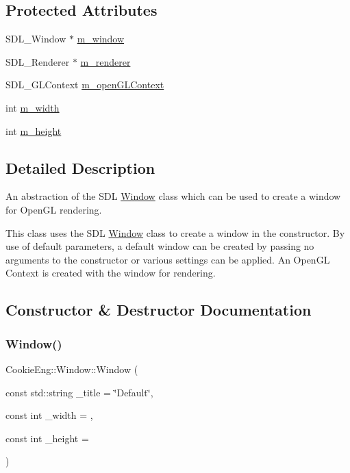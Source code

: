 \subsection*{Protected Attributes}
\begin{DoxyCompactItemize}
\item 
S\+D\+L\+\_\+\+Window $\ast$ \hyperlink{class_cookie_eng_1_1_window_a34a72976d2a24ceee23b88e3751a76bd}{m\+\_\+window}
\item 
S\+D\+L\+\_\+\+Renderer $\ast$ \hyperlink{class_cookie_eng_1_1_window_a9d6af268af7ac8c9dc6ce368d3d34e39}{m\+\_\+renderer}
\item 
S\+D\+L\+\_\+\+G\+L\+Context \hyperlink{class_cookie_eng_1_1_window_aa4fb697e5f3fb9890da293c6c19d2db4}{m\+\_\+open\+G\+L\+Context}
\item 
int \hyperlink{class_cookie_eng_1_1_window_a82302880d6f0fa6771a38cae96c86644}{m\+\_\+width}
\item 
int \hyperlink{class_cookie_eng_1_1_window_a08c89037c6226ccc826da3c06092dc18}{m\+\_\+height}
\end{DoxyCompactItemize}


\subsection{Detailed Description}
An abstraction of the S\+DL \hyperlink{class_cookie_eng_1_1_window}{Window} class which can be used to create a window for Open\+GL rendering. 

This class uses the S\+DL \hyperlink{class_cookie_eng_1_1_window}{Window} class to create a window in the constructor. By use of default parameters, a default window can be created by passing no arguments to the constructor or various settings can be applied. An Open\+GL Context is created with the window for rendering. 

\subsection{Constructor \& Destructor Documentation}
\mbox{\label{class_cookie_eng_1_1_window_ada0459ccc0ba0254bb9517cce1cf94bb}} 
\subsubsection{\texorpdfstring{Window()}{Window()}}
{\footnotesize\ttfamily Cookie\+Eng\+::\+Window\+::\+Window (\begin{DoxyParamCaption}\item[{const std\+::string}]{\+\_\+title = {\ttfamily \char`\"{}Default\char`\"{}},  }\item[{const int}]{\+\_\+width = {},  }\item[{const int}]{\+\_\+height = {} }\end{DoxyParamCaption})}



